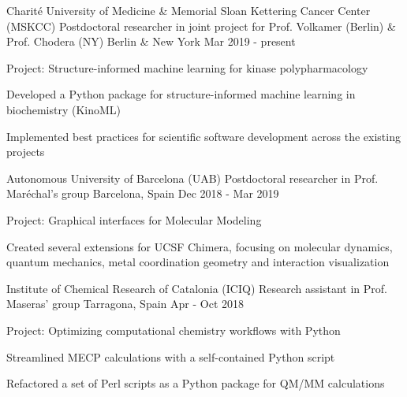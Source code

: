 


\begin{cventries}
  \cventry
    {Charité University of Medicine \& Memorial Sloan Kettering Cancer Center (MSKCC) } %
    {Postdoctoral researcher in joint project for Prof. Volkamer (Berlin) \& Prof. Chodera (NY)}  %
    {Berlin \& New York} %
    {Mar 2019 - present} %
    {
      \begin{cvitems} %
        \item {Project: Structure-informed machine learning for kinase polypharmacology}
        \item {Developed a Python package for structure-informed machine learning in biochemistry (KinoML)}
        \item {Implemented best practices for scientific software development across the existing projects\\}
      \end{cvitems}
    }
  \cventry
    {Autonomous University of Barcelona (UAB)} %
    {Postdoctoral researcher in Prof. Maréchal's group} %
    {Barcelona, Spain} %
    {Dec 2018 - Mar 2019} %
    {
      \begin{cvitems} %
        \item {Project: Graphical interfaces for Molecular Modeling}
        \item {Created several extensions for UCSF Chimera, focusing on molecular dynamics,\\
              quantum mechanics, metal coordination geometry and interaction visualization\\}
      \end{cvitems}
    }

  \cventry
    {Institute of Chemical Research of Catalonia (ICIQ)} %
    {Research assistant in Prof. Maseras' group} %
    {Tarragona, Spain} %
    {Apr - Oct 2018} %
    {
      \begin{cvitems} %
        \item {Project: Optimizing computational chemistry workflows with Python}
        \item {Streamlined MECP calculations with a self-contained Python script}
        \item {Refactored a set of Perl scripts as a Python package for QM/MM calculations\\}
      \end{cvitems}
    }


\end{cventries}
